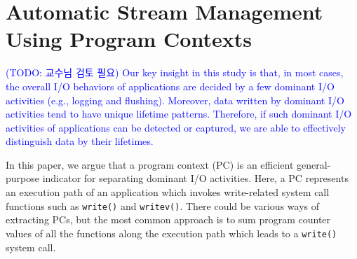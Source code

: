 \section{Automatic Stream Management Using Program Contexts}


{\textcolor{blue}{
(TODO: 교수님 검토 필요)
Our key insight in this study is that, in most cases, the overall I/O behaviors of 
applications are decided by a few dominant
I/O activities (e.g., logging and flushing). Moreover, 
data written by dominant I/O activities tend to have unique lifetime patterns.
Therefore, if such dominant I/O activities of applications can be detected or captured,
we are able to effectively distinguish data by their lifetimes.
}}

In this paper, we argue that a program context (PC) is an efficient
general-purpose indicator for separating dominant I/O activities.  Here, a PC
represents an execution path of an application which invokes write-related
system call functions such as {\tt write()} and {\tt writev()}.  
There could be various ways of extracting PCs, but the most common approach is to
sum program counter values of all the functions along the execution path which
leads to a \texttt{write()} system call.


